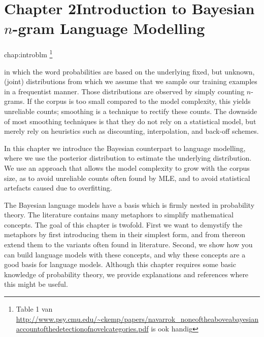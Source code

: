 \chapter{Chapter 2\newline Introduction to Bayesian $n$-gram %
Language Modelling}{chap:introblm}
\footnote{Table 1 van \url{http://www.psy.cmu.edu/~ckemp/papers/navarrok_noneoftheaboveabayesianaccountofthedetectionofnovelcategories.pdf} is ook handig}

 in which the word probabilities are based on the underlying fixed, but unknown, (joint) distributions from which we assume that we sample our training examples in a frequentist manner. Those distributions are observed by simply counting $n$-grams. If the corpus is too small compared to the model complexity, this yields unreliable counts; smoothing is a technique to rectify these counts.  The downside of most smoothing techniques is that they do not rely on a statistical model, but merely rely on heuristics such as discounting, interpolation, and back-off schemes.

In this chapter we introduce the Bayesian counterpart to language modelling, where we use the posterior distribution to estimate the underlying distribution. We use an approach that allows the model complexity to grow with the corpus size, as to avoid unreliable counts often found by MLE, and to avoid statistical artefacts caused due to overfitting. 

The Bayesian language models have a basis which is firmly nested in probability theory. The literature contains many metaphors to simplify mathematical concepts. The goal of this chapter is twofold. First we want to demystify the metaphors by first introducing them in their simplest form, and from thereon extend them to the variants often found in literature. Second, we show how you can build language models with these concepts, and why these concepts are a good basis for language models. Although this chapter requires some basic knowledge of probability theory, we provide explanations and references where this might be useful.

